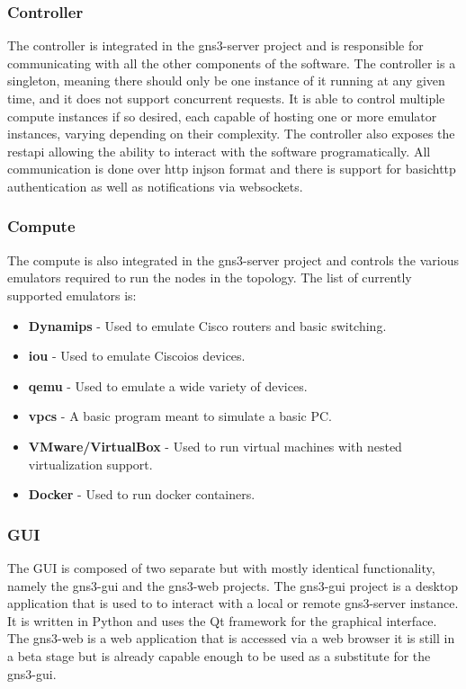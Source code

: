\subsubsection{Controller}
The controller is integrated in the gns3-server project and is responsible for communicating with all the other components 
of the software. The controller is a singleton, meaning there should only be one instance of it running at any given time, 
and it does not support concurrent requests. It is able to control multiple compute instances if so desired, each capable 
of hosting one or more emulator instances, varying depending on their complexity. The controller also exposes the 
\ac{rest}\ac{api} allowing the ability to interact with the software programatically. All communication is done over
\ac{http} in\ac{json} format and there is support for basic\ac{http} authentication as well as notifications via websockets.

\subsubsection{Compute}
The compute is also integrated in the gns3-server project and controls the various emulators required to run the nodes 
in the topology.
The list of currently supported emulators is:

\begin{itemize}
    \item \textbf{Dynamips} - Used to emulate Cisco routers and basic switching.
    \item \textbf{\ac{iou}} - Used to emulate Cisco\ac{ios} devices.
    \item \textbf{\ac{qemu}} - Used to emulate a wide variety of devices.
    \item \textbf{\ac{vpcs}} - A basic program meant to simulate a basic PC.
    \item \textbf{VMware/VirtualBox} - Used to run virtual machines with nested virtualization support.
    \item \textbf{Docker} - Used to run docker containers.
  \end{itemize}

\subsubsection{GUI}
The GUI is composed of two separate but with mostly identical functionality, namely the gns3-gui and the gns3-web projects.
The gns3-gui project is a desktop application that is used to to interact with a local or remote gns3-server instance. It 
is written in Python and uses the Qt framework for the graphical interface. The gns3-web is a web application that is 
accessed via a web browser it is still in a beta stage but is already capable enough to be used as a substitute for the 
gns3-gui.

